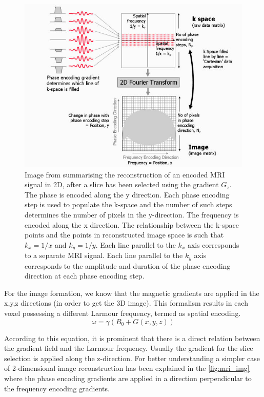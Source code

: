 \documentclass[msthesis.tex]{subfiles}
\begin{document}
\begin{figure}
    \centering
    \includegraphics[width=\textwidth]{images/img_reconstruction.jpg}
    \caption{Image from \cite{MRIrecon} summarising the reconstruction of an encoded MRI signal in 2D, after a slice has been selected using the gradient $G_z$. The phase is encoded along the y direction. Each phase encoding step is used to populate the k-space and the number of such steps determines the number of pixels in the y-direction. The frequency is encoded along the x direction. The relationship between the k-space points and the points in reconstructed image space is such that $k_x =1/x$ and $k_y= 1/y$. Each line parallel to the $k_x$ axis corresponds to a separate MRI signal. Each line parallel to the $k_y$ axis corresponds to the amplitude and duration of the phase encoding direction at each phase encoding step.}
    \label{fig:mri_img}
\end{figure}

For the image formation, we know that the magnetic gradients are applied in the x,y,z directions (in order to get the 3D image). This formalism results in each voxel possessing a different Larmour frequency, termed as spatial encoding. 
\begin{equation}
        \label{eq:larmour_grad}
          \omega = \gamma(B_0 + G(x, y, z))
     \end{equation}
       
According to this equation, it is prominent that there is a direct relation between the gradient field and the Larmour frequency. Usually the gradient for the slice selection is applied along the z-direction. For better understanding a simpler case of 2-dimensional image reconstruction has been explained in the \autoref{fig:mri_img} where the phase encoding gradients are applied in a direction perpendicular to the frequency encoding gradients.
\end{document}
